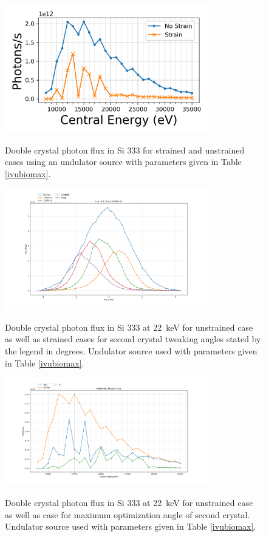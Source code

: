 \documentclass[preprint]{iucr}              %
\begin{document}
\begin{figure}
\caption{Double crystal photon flux in Si 333 for strained and unstrained cases using an undulator source with parameters given in Table \ref{ivubiomax}.}
\includegraphics[width = 8.85cm]{images/ivu333flux.png}
\label{fig:ivu333flux}
\end{figure}

\begin{figure}
\caption{Double crystal photon flux in Si 333 at 22~keV for unstrained case as well as strained cases for second crystal tweaking angles stated by the legend in degrees. Undulator source used with parameters given in Table \ref{ivubiomax}.}
\includegraphics[width = 8.85cm]{images/22kevangle.png}
\label{fig:22kevangle}
\end{figure}

\begin{figure}
\caption{Double crystal photon flux in Si 333 at 22~keV for unstrained case as well as case for maximum optimization angle of second crystal. Undulator source used with parameters given in Table \ref{ivubiomax}.}
\includegraphics[width = 8.85cm]{images/maxangleflux.png}
\label{fig:maxangleflux}
\end{figure}
\end{document}
